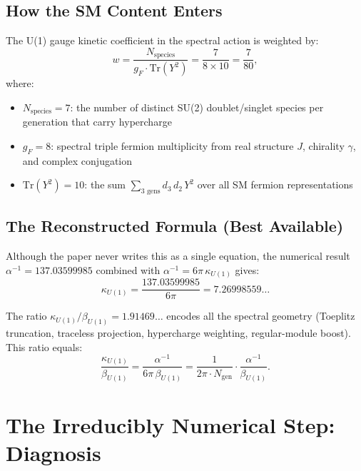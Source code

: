 \documentclass[11pt,a4paper]{article}
\theoremstyle{definition}
\begin{document}
\subsection{How the SM Content Enters}

The U(1) gauge kinetic coefficient in the spectral action is weighted by:
\begin{equation}
w = \frac{N_{\mathrm{species}}}{g_F \cdot \mathrm{Tr}(Y^2)} = \frac{7}{8 \times 10}
= \frac{7}{80},
\end{equation}
where:
\begin{itemize}
\item $N_{\mathrm{species}} = 7$: the number of distinct SU(2) doublet/singlet
species per generation that carry hypercharge
\item $g_F = 8$: spectral triple fermion multiplicity from real structure $J$,
chirality $\gamma$, and complex conjugation
\item $\mathrm{Tr}(Y^2) = 10$: the sum $\sum_{\text{3 gens}} d_3\, d_2\, Y^2$
over all SM fermion representations
\end{itemize}

\subsection{The Reconstructed Formula (Best Available)}

Although the paper never writes this as a single equation, the numerical result
$\alpha^{-1} = 137.03599985$ combined with $\alpha^{-1} = 6\pi\,\kappa_{U(1)}$
gives:
\begin{equation}\label{eq:kappa-numerical}
\kappa_{U(1)} = \frac{137.03599985}{6\pi} = 7.26998559\ldots
\end{equation}

The ratio $\kappa_{U(1)}/\beta_{U(1)} = 1.91469\ldots$ encodes all the spectral
geometry (Toeplitz truncation, traceless projection, hypercharge weighting,
regular-module boost).  This ratio equals:
\begin{equation}
\frac{\kappa_{U(1)}}{\beta_{U(1)}} = \frac{\alpha^{-1}}{6\pi\,\beta_{U(1)}}
= \frac{1}{2\pi \cdot N_{\mathrm{gen}}} \cdot \frac{\alpha^{-1}}{\beta_{U(1)}}.
\end{equation}

\section{The Irreducibly Numerical Step: Diagnosis}
\end{document}
